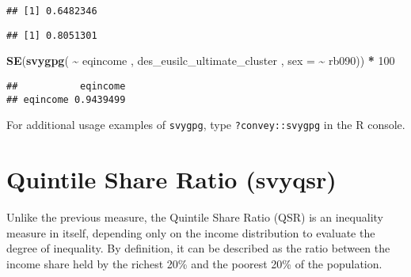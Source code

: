 \documentclass[
]{book}
\newenvironment{Shaded}{\begin{snugshade}}{\end{snugshade}}
\newcommand{\AttributeTok}[1]{\textcolor[rgb]{0.13,0.29,0.53}{#1}}
\newcommand{\CommentTok}[1]{\textcolor[rgb]{0.56,0.35,0.01}{\textit{#1}}}
\newcommand{\DecValTok}[1]{\textcolor[rgb]{0.00,0.00,0.81}{#1}}
\newcommand{\FunctionTok}[1]{\textcolor[rgb]{0.13,0.29,0.53}{\textbf{#1}}}
\newcommand{\NormalTok}[1]{#1}
\newcommand{\SpecialCharTok}[1]{\textcolor[rgb]{0.81,0.36,0.00}{\textbf{#1}}}
\begin{document}
\begin{Shaded}
\end{Shaded}

\begin{verbatim}
## [1] 0.6482346
\end{verbatim}

\begin{Shaded}
\end{Shaded}

\begin{verbatim}
## [1] 0.8051301
\end{verbatim}

\begin{Shaded}
\begin{Highlighting}[]
\FunctionTok{SE}\NormalTok{(}\FunctionTok{svygpg}\NormalTok{( }\SpecialCharTok{\textasciitilde{}}\NormalTok{ eqincome , des\_eusilc\_ultimate\_cluster , }\AttributeTok{sex =} \SpecialCharTok{\textasciitilde{}}\NormalTok{ rb090)) }\SpecialCharTok{*} \DecValTok{100}
\end{Highlighting}
\end{Shaded}

\begin{verbatim}
##           eqincome
## eqincome 0.9439499
\end{verbatim}

For additional usage examples of \texttt{svygpg}, type \texttt{?convey::svygpg} in the R console.

\hypertarget{quintile-share-ratio-svyqsr}{%
\section{Quintile Share Ratio (svyqsr)}\label{quintile-share-ratio-svyqsr}}

Unlike the previous measure, the Quintile Share Ratio (QSR) is an inequality measure in itself, depending only on the income distribution to evaluate the degree of inequality. By definition, it can be described as the ratio between the income share held by the richest 20\% and the poorest 20\% of the population.
\end{document}

